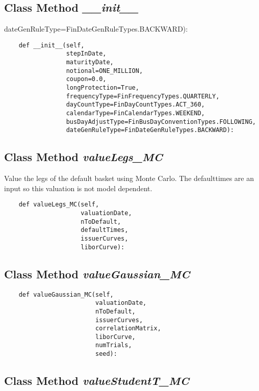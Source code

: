 \documentclass[twoside,11pt]{book}
\begin{document}
\subsection{Class Method {\it \_\_init\_\_}}
dateGenRuleType=FinDateGenRuleTypes.BACKWARD):

\begin{lstlisting}
    def __init__(self,
                 stepInDate,
                 maturityDate,
                 notional=ONE_MILLION,
                 coupon=0.0,
                 longProtection=True,
                 frequencyType=FinFrequencyTypes.QUARTERLY,
                 dayCountType=FinDayCountTypes.ACT_360,
                 calendarType=FinCalendarTypes.WEEKEND,
                 busDayAdjustType=FinBusDayConventionTypes.FOLLOWING,
                 dateGenRuleType=FinDateGenRuleTypes.BACKWARD):
\end{lstlisting}

\subsection{Class Method {\it valueLegs\_MC}}
Value the legs of the default basket using Monte Carlo. The defaulttimes are an input so this valuation is not model dependent. 

\begin{lstlisting}
    def valueLegs_MC(self,
                     valuationDate,
                     nToDefault,
                     defaultTimes,
                     issuerCurves,
                     liborCurve):
\end{lstlisting}

\subsection{Class Method {\it valueGaussian\_MC}}


\begin{lstlisting}
    def valueGaussian_MC(self,
                         valuationDate,
                         nToDefault,
                         issuerCurves,
                         correlationMatrix,
                         liborCurve,
                         numTrials,
                         seed):
\end{lstlisting}

\subsection{Class Method {\it valueStudentT\_MC}}
\end{document}
